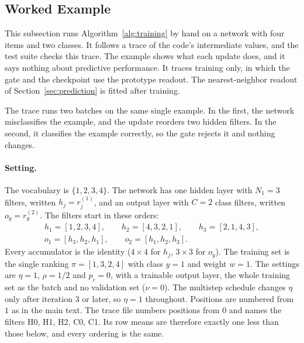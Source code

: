 \subsection{Worked Example}\label{supp:worked-example}

This subsection runs Algorithm~\ref{alg:training} by hand on a network with four items and two classes. It follows a trace of the code's intermediate values, and the test suite checks this trace. The example shows what each update does, and it says nothing about predictive performance. It traces training only, in which the gate and the checkpoint use the prototype readout. The nearest-neighbor readout of Section~\ref{sec:prediction} is fitted after training.

The trace runs two batches on the same single example. In the first, the network misclassifies the example, and the update reorders two hidden filters. In the second, it classifies the example correctly, so the gate rejects it and nothing changes.

\paragraph{Setting.} The vocabulary is $\{1,2,3,4\}$. The network has one hidden layer with $N_1=3$ filters, written $h_j=r^{(1)}_j$, and an output layer with $C=2$ class filters, written $o_y=r^{(2)}_y$. The filters start in these orders:
\begin{gather*}
h_1=[1,2,3,4],\qquad h_2=[4,3,2,1],\qquad h_3=[2,1,4,3],\\
o_1=[h_3,h_2,h_1],\qquad o_2=[h_1,h_2,h_3].
\end{gather*}
Every accumulator is the identity ($4\times4$ for $h_j$, $3\times3$ for $o_y$). The training set is the single ranking $\pi=[1,3,2,4]$ with class $y=1$ and weight $w=1$. The settings are $\eta=1$, $\rho=1/2$ and $p_c=0$, with a trainable output layer, the whole training set as the batch and no validation set ($\nu=0$). The multistep schedule changes $\eta$ only after iteration $3$ or later, so $\eta=1$ throughout. Positions are numbered from $1$ as in the main text. The trace file numbers positions from $0$ and names the filters H0, H1, H2, C0, C1. Its row means are therefore exactly one less than those below, and every ordering is the same.

